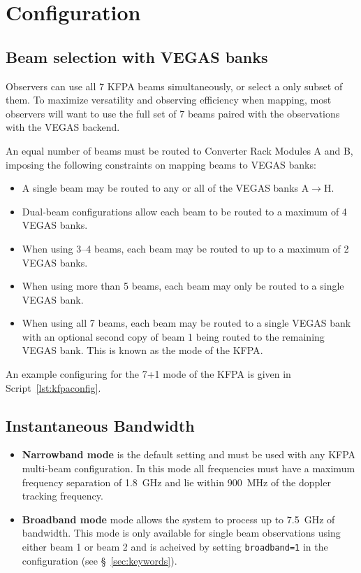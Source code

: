 \newpage

\section{Configuration}\label{sec:kfpa_configuration}

\subsection{Beam selection with VEGAS banks}
Observers can use all 7 \gls{KFPA} beams simultaneously, or select a only subset of
them. To maximize versatility and observing efficiency when mapping, most observers will
want to use the full set of 7 beams paired with the observations with the VEGAS backend.

An equal number of beams must be routed to Converter Rack Modules A and B, imposing the
following constraints on mapping beams to \gls{VEGAS} banks:

\begin{itemize}[leftmargin=*,itemsep=1pt]
\item A single beam may be routed to any  or all of the \gls{VEGAS} banks A$\rightarrow$H.
\item Dual-beam configurations allow each beam to be routed to a maximum of
4 \gls{VEGAS} banks.
\item When using 3--4 beams, each beam may be routed to up to a maximum of
2 \gls{VEGAS} banks.
\item When using more than 5 beams, each beam may only be routed to a
single \gls{VEGAS} bank.
\item When using all 7 beams, each beam may be routed to a single \gls{VEGAS} bank
with an optional second copy of beam 1 being routed to the remaining \gls{VEGAS}
bank. This is known as the  mode of the \gls{KFPA}.
\end{itemize}

An example configuring for the 7+1 mode of the \gls{KFPA} is given in Script~\ref{lst:kfpaconfig}.

\subsection{Instantaneous Bandwidth}

\begin{itemize}[leftmargin=*]
\item {\bf Narrowband mode} is the default setting and must be used with any
\gls{KFPA} multi-beam configuration. In this mode all frequencies must have a
maximum frequency separation of 1.8~GHz and lie within 900~MHz of the doppler
tracking frequency.

\item {\bf Broadband mode} mode allows the system to process up to 7.5~GHz of
bandwidth. This mode is only available for single beam observations using either
beam 1 or beam 2 and is acheived by setting {\tt broadband=1} in the
configuration (see \S~\ref{sec:keywords}).
\end{itemize}


